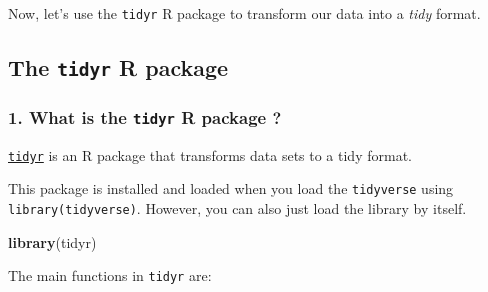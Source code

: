 \documentclass[]{article}
\newenvironment{Shaded}{\begin{snugshade}}{\end{snugshade}}
\newcommand{\KeywordTok}[1]{\textcolor[rgb]{0.13,0.29,0.53}{\textbf{#1}}}
\newcommand{\NormalTok}[1]{#1}
\begin{document}
Now, let's use the \texttt{tidyr} R package to transform our data into a
\emph{tidy} format.

\hypertarget{the-tidyr-r-package}{%
\subsection{\texorpdfstring{The \texttt{tidyr} R
package}{The tidyr R package}}\label{the-tidyr-r-package}}

\hypertarget{what-is-the-tidyr-r-package}{%
\subsubsection{\texorpdfstring{1. What is the \texttt{tidyr} R package
?}{1. What is the tidyr R package ?}}\label{what-is-the-tidyr-r-package}}

\href{https://cran.r-project.org/web/packages/tidyr/vignettes/tidy-data.html}{\texttt{tidyr}}
is an R package that transforms data sets to a tidy format.

This package is installed and loaded when you load the
\texttt{tidyverse} using \texttt{library(tidyverse)}. However, you can
also just load the library by itself.

\begin{Shaded}
\begin{Highlighting}[]
\KeywordTok{library}\NormalTok{(tidyr)}
\end{Highlighting}
\end{Shaded}

The main functions in \texttt{tidyr} are:
\end{document}

